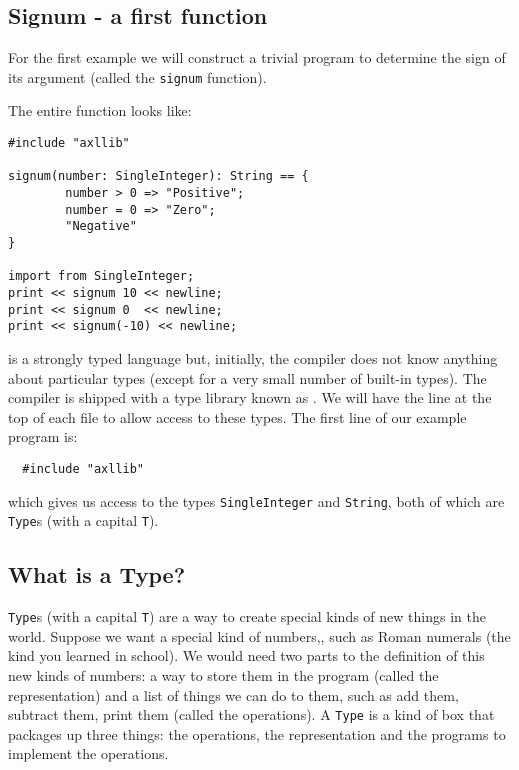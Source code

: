 \subsection{Signum - a first function}

For the first example we will construct a trivial program to determine
the sign of its argument (called the \verb"signum" function).

The entire function looks like:

\begin{small}
\begin{verbatim}
#include "axllib"

signum(number: SingleInteger): String == {
        number > 0 => "Positive"; 
        number = 0 => "Zero";
        "Negative"
}

import from SingleInteger;
print << signum 10 << newline;
print << signum 0  << newline;
print << signum(-10) << newline;
\end{verbatim}
\end{small}

\asharp{} is a strongly typed language but, initially, the
compiler does not know
anything about particular types (except for a very small number of
built-in types). The compiler is shipped with a type library
known as . We will have the line  at the top
of each file to allow access to these types. The first line of our
example program is:

\begin{small}
\begin{verbatim}
  #include "axllib"
\end{verbatim}
\end{small}

which gives us access to the types \verb"SingleInteger" and \verb"String", both of
which are \verb"Type"s (with a capital \verb"T"). 

\subsection{What is a Type?}

\verb"Type"s (with a capital \verb"T") are a way to create special
kinds of new things 
in the world. Suppose we want a special kind of numbers,, such as Roman 
numerals (the kind you learned in school). We would need two parts to
the definition of 
this new kinds of numbers: a way to store them in the program (called
the representation) and a list of things we can do to them, such as 
add them, subtract them, print them \etc{} (called the operations).  A
\verb"Type" is a kind of box that packages up three things: the
operations, the representation and the programs to implement the
operations.

